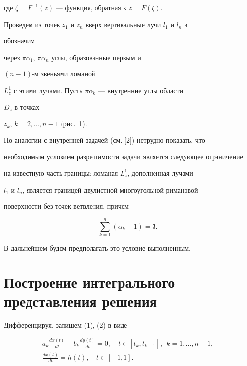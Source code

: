 где $\zeta=F^{-1}(z)$ --- функция, обратная к $z=F(\zeta)$. 


Проведем из точек $z_1$ и $z_n$ вверх вертикальные лучи $l_1$ и $l_n$ и 


обозначим 


через $\pi\alpha_1$, $\pi\alpha_n$ углы, образованные первым и 


$(n-1)$-м звеньями ломаной 


$L^1_z$ с этими лучами. Пусть $\pi\alpha_k$ --- внутренние углы области 


$D_z$ в точках 


$z_k$, $k=2,\dotsc,n-1$ (рис.~1). 


 


По аналогии с внутренней задачей (см. [2]) нетрудно показать, что 


необходимым условием разрешимости задачи является следующее ограничение 


на известную часть границы: ломаная $L^1_z$, дополненная лучами 


$l_1$ и $l_n$, является границей двулистной многоугольной римановой 


поверхности без точек ветвления, причем 


$$ 


\sum^n_{k=1}(\alpha_k-1)=3. 


$$ 


В дальнейшем будем предполагать это условие выполненным. 


 


\section{Построение интегрального представления решения} 


 


Дифференцируя, запишем (1), (2) в виде


\begin{gather*} 


a_k\frac{dx(t)}{dt}-b_k\frac{dy(t)}{dt}=0,\quad 


t\in[t_k,t_{k+1}],\ \ k=1,\dotsc,n-1, \\ 


% 


\frac{dx(t)}{dt}=h(t),\quad t\in[-1,1]. 


\end{gather*} 


